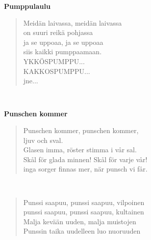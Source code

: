 \noindent\begin{minipage}{\linewidth}
\vspace{5pt}
\parbox[t]{0.85\linewidth}{\raggedright {\large\bf Pumppulaulu}\\[6pt]}
\begin{verse}
	Meidän laivassa, meidän laivassa\\
	on suuri reikä pohjassa\\
	ja se uppoaa, ja se uppoaa\\
	siis kaikki pumppaamaan.\\
	YKKÖSPUMPPU...\\
	KAKKOSPUMPPU...\\
	jne...\\
\end{verse}
\end{minipage}\\[10pt]
%
%
\noindent\begin{minipage}{\linewidth}
\vspace{5pt}
\parbox[t]{0.85\linewidth}{\raggedright {\large\bf Punschen kommer}\\[6pt]}
\begin{verse}
	Punschen kommer, punschen kommer,\\
	ljuv och sval.\\
	Glasen imma, röster stimma i vår sal.\\
	Skål för glada minnen! Skål för varje vår!\\
	inga sorger finnas mer, när punsch vi får.\\
\end{verse}
\end{minipage}\\[10pt]
\noindent\begin{minipage}{\linewidth}
\begin{verse}
	Punssi saapuu, punssi saapuu, vilpoinen\\
	punssi saapuu, punssi saapuu, kultainen\\
	Malja kevään uuden, malja muistojen\\
	Punssin taika uudelleen luo nuoruuden\\
\end{verse}
\end{minipage}\\[10pt]
